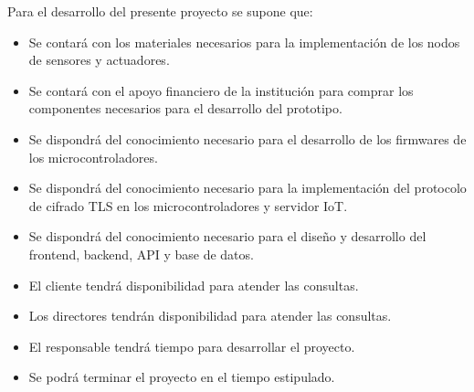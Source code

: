 Para el desarrollo del presente proyecto se supone que:

\begin{itemize}
	\item Se contará con los materiales necesarios para la implementación de los nodos de sensores y actuadores.
	\item Se contará con el apoyo financiero de la institución para comprar los componentes necesarios para el 
	desarrollo del prototipo.
	\item Se dispondrá del conocimiento necesario para el desarrollo de los firmwares de los microcontroladores.
	\item Se dispondrá del conocimiento necesario para la implementación del protocolo de cifrado TLS en los microcontroladores y servidor IoT.
	\item Se dispondrá del conocimiento necesario para el diseño y desarrollo del frontend, backend, API y base de datos.
	\item El cliente tendrá disponibilidad para atender las consultas.
	\item Los directores tendrán disponibilidad para atender las consultas.
	\item El responsable tendrá tiempo para desarrollar el proyecto.
	\item Se podrá terminar el proyecto en el tiempo estipulado.
\end{itemize}